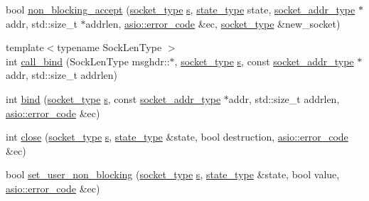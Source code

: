 \begin{DoxyCompactItemize}
\item 
bool \hyperlink{namespaceasio_1_1detail_1_1socket__ops_ae084d56810896cc9edafc565e48512dd}{non\+\_\+blocking\+\_\+accept} (\hyperlink{namespaceasio_1_1detail_a6798c771dd84b79798b1a08150706ea9}{socket\+\_\+type} \hyperlink{group__async__connect_ga31ab74b9ea6c77932dddd016cfc7920a}{s}, \hyperlink{namespaceasio_1_1detail_1_1socket__ops_a5ce32ee297edef8833113ea35a933054}{state\+\_\+type} state, \hyperlink{namespaceasio_1_1detail_a40a7b0385a38f87815ffbb8df5e34d05}{socket\+\_\+addr\+\_\+type} $\ast$addr, std\+::size\+\_\+t $\ast$addrlen, \hyperlink{classasio_1_1error__code}{asio\+::error\+\_\+code} \&ec, \hyperlink{namespaceasio_1_1detail_a6798c771dd84b79798b1a08150706ea9}{socket\+\_\+type} \&new\+\_\+socket)
\item 
{\footnotesize template$<$typename Sock\+Len\+Type $>$ }\\int \hyperlink{namespaceasio_1_1detail_1_1socket__ops_a802999f3be708c6e3e99c4c39a6148a7}{call\+\_\+bind} (Sock\+Len\+Type msghdr\+::$\ast$, \hyperlink{namespaceasio_1_1detail_a6798c771dd84b79798b1a08150706ea9}{socket\+\_\+type} \hyperlink{group__async__connect_ga31ab74b9ea6c77932dddd016cfc7920a}{s}, const \hyperlink{namespaceasio_1_1detail_a40a7b0385a38f87815ffbb8df5e34d05}{socket\+\_\+addr\+\_\+type} $\ast$addr, std\+::size\+\_\+t addrlen)
\item 
int \hyperlink{namespaceasio_1_1detail_1_1socket__ops_a86014a1273549d66157c6e4dd9532f86}{bind} (\hyperlink{namespaceasio_1_1detail_a6798c771dd84b79798b1a08150706ea9}{socket\+\_\+type} \hyperlink{group__async__connect_ga31ab74b9ea6c77932dddd016cfc7920a}{s}, const \hyperlink{namespaceasio_1_1detail_a40a7b0385a38f87815ffbb8df5e34d05}{socket\+\_\+addr\+\_\+type} $\ast$addr, std\+::size\+\_\+t addrlen, \hyperlink{classasio_1_1error__code}{asio\+::error\+\_\+code} \&ec)
\item 
int \hyperlink{namespaceasio_1_1detail_1_1socket__ops_a4760d49c99fce56c04fb8802987d0c44}{close} (\hyperlink{namespaceasio_1_1detail_a6798c771dd84b79798b1a08150706ea9}{socket\+\_\+type} \hyperlink{group__async__connect_ga31ab74b9ea6c77932dddd016cfc7920a}{s}, \hyperlink{namespaceasio_1_1detail_1_1socket__ops_a5ce32ee297edef8833113ea35a933054}{state\+\_\+type} \&state, bool destruction, \hyperlink{classasio_1_1error__code}{asio\+::error\+\_\+code} \&ec)
\item 
bool \hyperlink{namespaceasio_1_1detail_1_1socket__ops_ac72e73a316330cf59e40d4b0a1816fae}{set\+\_\+user\+\_\+non\+\_\+blocking} (\hyperlink{namespaceasio_1_1detail_a6798c771dd84b79798b1a08150706ea9}{socket\+\_\+type} \hyperlink{group__async__connect_ga31ab74b9ea6c77932dddd016cfc7920a}{s}, \hyperlink{namespaceasio_1_1detail_1_1socket__ops_a5ce32ee297edef8833113ea35a933054}{state\+\_\+type} \&state, bool value, \hyperlink{classasio_1_1error__code}{asio\+::error\+\_\+code} \&ec)

\end{DoxyCompactItemize}
